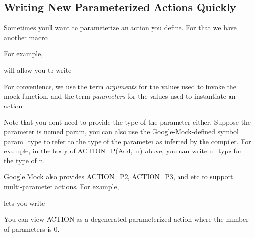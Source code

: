 \subsection*{Writing New Parameterized Actions Quickly}

Sometimes you\textquotesingle{}ll want to parameterize an action you define. For that we have another macro 
\begin{DoxyCode}{0}
\end{DoxyCode}


For example, 
\begin{DoxyCode}{0}
\end{DoxyCode}
 will allow you to write 
\begin{DoxyCode}{0}
\end{DoxyCode}


For convenience, we use the term {\itshape arguments} for the values used to invoke the mock function, and the term {\itshape parameters} for the values used to instantiate an action.

Note that you don\textquotesingle{}t need to provide the type of the parameter either. Suppose the parameter is named {\ttfamily param}, you can also use the Google-\/\+Mock-\/defined symbol {\ttfamily param\+\_\+type} to refer to the type of the parameter as inferred by the compiler. For example, in the body of {\ttfamily \mbox{\hyperlink{gmock-generated-actions_8h_a8ee9766f611f068271ca37a90c0e5960}{A\+C\+T\+I\+O\+N\+\_\+\+P(\+Add, n)}}} above, you can write {\ttfamily n\+\_\+type} for the type of {\ttfamily n}.

Google \mbox{\hyperlink{classMock}{Mock}} also provides {\ttfamily A\+C\+T\+I\+O\+N\+\_\+\+P2}, {\ttfamily A\+C\+T\+I\+O\+N\+\_\+\+P3}, and etc to support multi-\/parameter actions. For example, 
\begin{DoxyCode}{0}
\DoxyCodeLine{\}}
\end{DoxyCode}
 lets you write 
\begin{DoxyCode}{0}
\end{DoxyCode}


You can view {\ttfamily A\+C\+T\+I\+ON} as a degenerated parameterized action where the number of parameters is 0.

